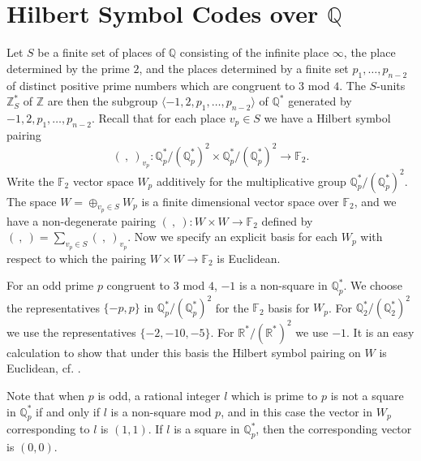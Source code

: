 \documentclass[noams]{compositio}
\theoremstyle{definition} %
\theoremstyle{remark} %
\DeclareMathOperator{\Spec}{\mathrm{Spec}}
\newcommand{\F}{\mathbb{F}}
\newcommand{\Q}{\mathbb{Q}}
\newcommand{\R}{\mathbb{R}}
\begin{document}



\section{Hilbert Symbol Codes over $\mathbb{Q}$}
\label{sec:Hibcode}

Let $S$ be a finite set of places of $\mathbb{Q}$ consisting of the infinite place $\infty$,
the place determined by the prime $2$, and the places determined by a finite
set $p_1,\ldots,p_{n-2}$ of distinct positive prime numbers which are congruent to $3$ mod $4$.
The $S$-units $\mathbb{Z}_S^*$ of $\mathbb{Z}$ are then the subgroup $\langle -1, 2, p_1,\ldots,p_{n-2}\rangle $ of $\mathbb{Q}^*$
generated by $-1, 2, p_1,\ldots,p_{n-2}$. Recall that for each place $v_p \in S$
we have a Hilbert symbol pairing
$$(\ , \ )_{v_p}:\Q_{p}^*/(\Q_{p}^*)^2 \times \Q_{p}^*/(\Q_{p}^*)^2 \to \F_2.$$
Write the $\F_2$ vector space $W_p$ additively for the multiplicative group $\Q_{p}^* / (\Q_{p}^*)^2$. The space $W = \oplus_{v_p \in S} W_p$ is a finite dimensional vector space
over $\F_2$, and we have a non-degenerate pairing $(\ , \ ):W \times W \to \F_2$ defined
by $(\ ,\  ) = \sum_{v_p \in S}(\ , \ )_{v_p}$. Now we specify an explicit basis for each $W_p$ with respect to which the pairing $W\times W\to \F_2$ is Euclidean.

For an odd prime $p$ congruent to $3$ mod $4$, $-1$ is a non-square in $\Q^*_p$. We choose the representatives $\{-p, p\}$ in $\Q^*_p/(\Q^*_p)^2$ for the $\F_2$ basis for $W_p$.  For $\Q_2^*/(\Q_2^*)^2$ we use the representatives $\{-2, -10, -5\}$. For $\R^*/(\R^*)^2$ we use $-1$. It is an easy calculation to show that under this basis the Hilbert symbol pairing on $W$ is Euclidean, cf.  \cite[p. 23]{Serre1973}. 

Note that when $p$ is odd, a rational integer $l$ which is prime to $p$ is not a square in $\Q^*_p$ if and only if $l$ is a non-square mod $p$, and in this case the vector in $W_p$ corresponding to $l$ is $(1,1)$. If $l$ is a square in $\Q^*_p$, then the corresponding vector is $(0,0)$.
\end{document}
